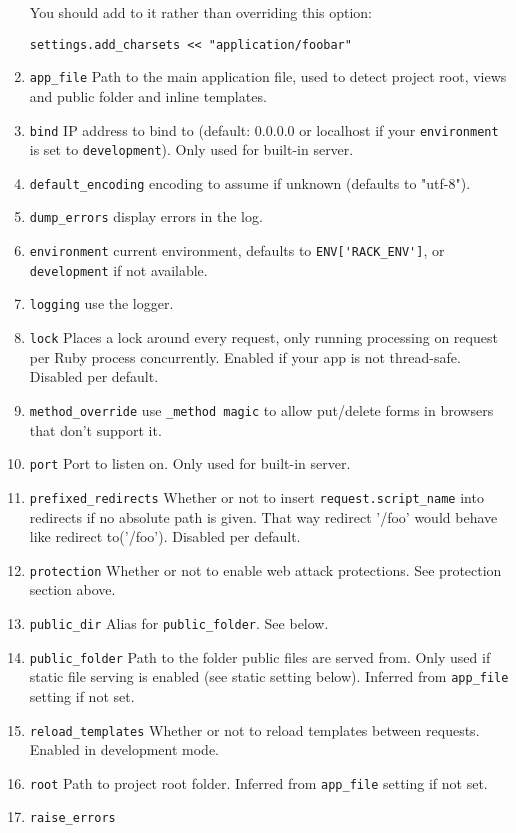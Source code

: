 \begin{enumerate}
You should add to it rather than overriding this option: 
\begin{verbatim}
settings.add_charsets << "application/foobar"
\end{verbatim}
\item 
\verb|app_file|
Path to the main application file, used to detect project root, views and public folder and inline templates.
\item 
\verb|bind|
IP address to bind to (default: 0.0.0.0 or localhost if your \verb|environment| is set to 
\verb|development|). Only used for built-in server.
\item 
\verb|default_encoding|
encoding to assume if unknown (defaults to "utf-8").
\item 
\verb|dump_errors|
display errors in the log.
\item 
\verb|environment|
current environment, defaults to \verb|ENV['RACK_ENV']|, 
or \verb"development" if not available.
\item 
\verb|logging|
use the logger.
\item 
\verb|lock|
Places a lock around every request, only running processing on request per Ruby process concurrently.
Enabled if your app is not thread-safe. Disabled per default.
\item 
\verb|method_override|
use \verb|_method magic| to allow put/delete forms in browsers that don't support it.
\item 
\verb|port|
Port to listen on. Only used for built-in server.
\item \verb|prefixed_redirects|
Whether or not to insert \verb|request.script_name| into redirects if no absolute path is given. That way redirect '/foo' would behave like redirect to('/foo'). Disabled per default.
\item \verb|protection|
Whether or not to enable web attack protections. See protection section above.
\item \verb|public_dir|
Alias for \verb|public_folder|. See below.
\item \verb|public_folder|
Path to the folder public files are served from. Only used if static file serving is enabled (see static setting below). Inferred from \verb|app_file| setting if not set.
\item \verb|reload_templates|
Whether or not to reload templates between requests. Enabled in development mode.
\item \verb|root|
Path to project root folder. Inferred from \verb|app_file| setting if not set.
\item \verb|raise_errors|

\end{enumerate}
